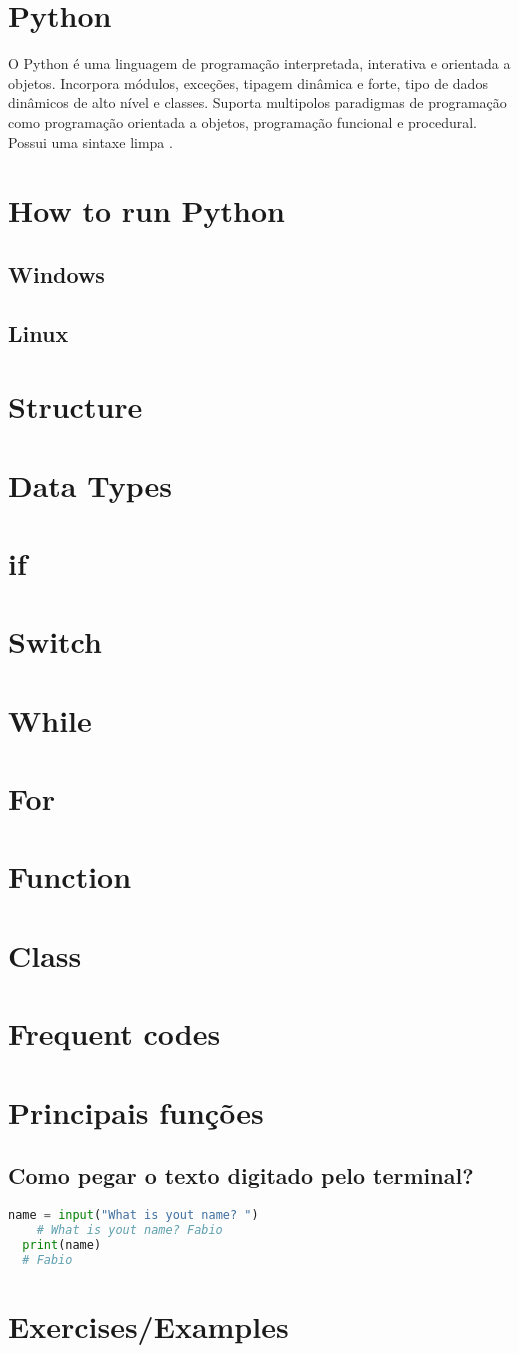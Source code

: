 \chapter{Python}

O Python é uma linguagem de programação interpretada, interativa e orientada a objetos. Incorpora módulos, exceções, tipagem dinâmica e forte, tipo de dados  dinâmicos de alto nível e classes. Suporta multipolos paradigmas de programação como programação orientada a objetos, programação funcional e procedural. Possui uma sintaxe limpa \cite{pythonDocs}.

\chapter{How to run Python}
\section{Windows}
\section{Linux}
\chapter{Structure}
\chapter{Data Types}
\chapter{if}
\chapter{Switch}
\chapter{While}
\chapter{For}
\chapter{Function}
\chapter{Class}
\chapter{Frequent codes}
\chapter{Principais funções}
\section{Como pegar o texto digitado pelo terminal?}
\begin{lstlisting}[language=python]
	name = input("What is yout name? ")
	# What is yout name? Fabio
  print(name)
  # Fabio
  \end{lstlisting}
\chapter{Exercises/Examples}
